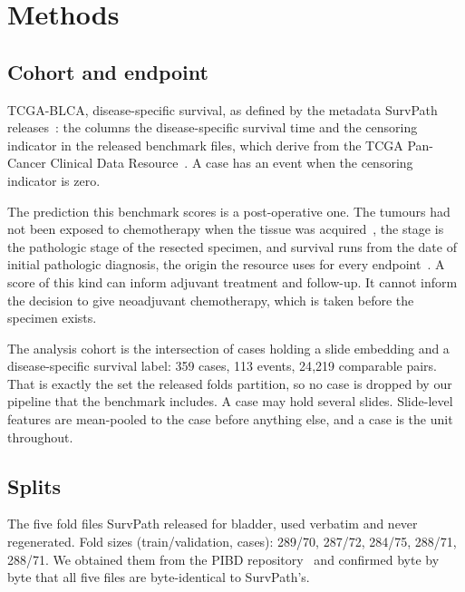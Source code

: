 %

\section*{Methods}

\subsection*{Cohort and endpoint}

TCGA-BLCA, disease-specific survival, as defined by the metadata SurvPath
releases~\citep{jaume2024survpath}: the columns the disease-specific survival time and
the censoring indicator in the released benchmark files, which derive from the
TCGA Pan-Cancer Clinical Data Resource~\citep{liu2018tcgacdr}. A case has an event when
the censoring indicator is zero.

The prediction this benchmark scores is a post-operative one. The tumours had not been exposed
to chemotherapy when the tissue was acquired~\citep{robertson2017blca}, the stage is the
pathologic stage of the resected specimen, and survival runs from the date of initial pathologic
diagnosis, the origin the resource uses for every endpoint~\citep{liu2018tcgacdr}. A score of this
kind can inform adjuvant treatment and follow-up. It cannot inform the decision to give
neoadjuvant chemotherapy, which is taken before the specimen exists.

The analysis cohort is the intersection of cases holding a slide embedding and a disease-specific
survival label: 359 cases, 113 events, 24{,}219 comparable pairs. That is exactly the set
the released folds partition, so no case is dropped by our pipeline that the benchmark includes.
A case may hold several slides. Slide-level features are mean-pooled to the case before anything
else, and a case is the unit throughout.

\subsection*{Splits}

The five fold files SurvPath released for bladder, used verbatim and never regenerated.
Fold sizes (train/validation, cases): 289/70, 287/72, 284/75, 288/71, 288/71. We obtained them from
the PIBD repository~\citep{zhang2024pibd} and confirmed byte by byte that all five files are
byte-identical to SurvPath's.

